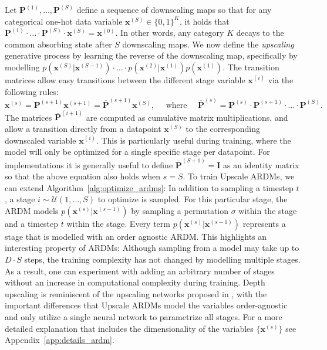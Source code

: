 \documentclass{article} \usepackage{iclr2022_conference,times}
\def\vx{{\bm{x}}}
\begin{document}
Let $\mathbf{P}^{(1)}, \ldots, \mathbf{P}^{(S)}$ define a sequence of downscaling maps so that for any categorical one-hot data variable $\vx^{(S)} \in \{0, 1\}^{K}$, it holds that $\mathbf{P}^{(1)} \cdot \ldots \cdot \mathbf{P}^{(S)} \cdot \vx^{(S)} = \vx^{(0)}$. In other words, any category $K$ decays to the common absorbing state after $S$ downscaling maps. We now define the \textit{upscaling} generative process by learning the reverse of the downscaling map, specifically by modelling $p(\vx^{(S)} | \vx^{(S-1)}) \cdot \ldots \cdot p(\vx^{(2)} | \vx^{(1)}) p(\vx^{(1)})$. The transition matrices allow easy transitions between the different stage variable $\vx^{(i)}$ via the following rules:
$$\vx^{(s)} = \mathbf{P}^{(s+1)} \vx^{(s+1)} = \overline{\mathbf{P}}^{(s+1)} \vx^{(S)}, \quad \text{ where } \quad \overline{\mathbf{P}}^{(s)} = \mathbf{P}^{(s)} \cdot \mathbf{P}^{(s+1)} \cdot \ldots \cdot \mathbf{P}^{(S)}.$$
The matrices $\overline{\mathbf{P}}^{(i+1)}$ are computed as cumulative matrix multiplications, and allow a transition directly from a datapoint $\vx^{(S)}$ to the corresponding downscaled variable $\vx^{(i)}$. This is particularly useful during training, where the model will only be optimized for a single specific stage per datapoint. For implementations it is generally useful to define $\overline{\mathbf{P}}^{(S+1)} = \mathbf{I}$ as an identity matrix so that the above equation also holds when $s = S$. To train Upscale ARDMs, we can extend Algorithm~\ref{alg:optimize_ardms}: In addition to sampling a timestep $t$, a stage $i \sim \mathcal{U}(1, \ldots, S)$ to optimize is sampled. For this particular stage, the ARDM models $p(\vx^{(s)} | \vx^{(s-1)})$ by sampling a permutation $\sigma$ within the stage and a timestep $t$ within the stage. Every term $p(\vx^{(s)} | \vx^{(s-1)})$ represents a stage that is modelled with an order agnostic ARDM. This highlights an interesting property of ARDMs: Although sampling from a model may take up to $D \cdot S$ steps, the training complexity has not changed by modelling multiple stages. As a result, one can experiment with adding an arbitrary number of stages without an increase in computational complexity during training. Depth upscaling is reminiscent of the upscaling networks proposed in \citep{kalchbrenner2018efficientneural,menick2019SPN}, with the important differences that Upscale ARDMs model the variables order-agnostic and only utilize a single neural network to parametrize all stages. For a more detailed explanation that includes the dimensionality of the variables $\{\vx^{(s)}\}$ see Appendix~\ref{app:details_ardm}.
\end{document}
